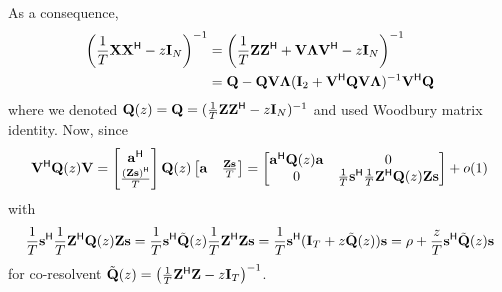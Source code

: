 \documentclass[11pt,a4paper]{article}
\begin{document}
As a consequence, 
\begin{align*}
	\left(\frac1T \X \X^\H - z \I_N \right)^{-1} &= \left(\frac1T \Z \Z^\H + \V \bLambda \V^\H - z \I_N \right)^{-1} \\ 
	&= \Q - \Q \V \bLambda (\I_2 + \V^\H \Q \V \bLambda)^{-1} \V^\H \Q
\end{align*}
where we denoted $\Q(z) = \Q = (\frac1T \Z \Z^\H - z \I_N)^{-1}$ and used Woodbury matrix identity. Now, since
\begin{equation}
	\V^\H \Q(z) \V = \begin{bmatrix}\mathbf{a}^\H \\ \frac{(\Z \s)^\H}{T}\end{bmatrix} \Q(z) \begin{bmatrix}\mathbf{a} & \frac{\Z \s}{T}\end{bmatrix} = \begin{bmatrix} \mathbf{a}^\H \Q(z) \mathbf{a} & 0 \\ 0 & \frac1T \s^\H \frac1T \Z^\H \Q(z) \Z \s \end{bmatrix} + o(1)
\end{equation}
with
\begin{equation}
	\frac1T \s^\H \frac1T \Z^\H \Q(z) \Z \s = \frac1T \s^\H \tilde \Q(z) \frac1T \Z^\H \Z \s = \frac1T \s^\H (\I_T + z \tilde \Q(z)) \s = \rho + \frac{z}T \s^\H \tilde \Q(z) \s
\end{equation}
for co-resolvent $\tilde \Q(z) = \left( \frac1T \Z^\H \Z - z \I_T \right)^{-1}$.
\end{document}
